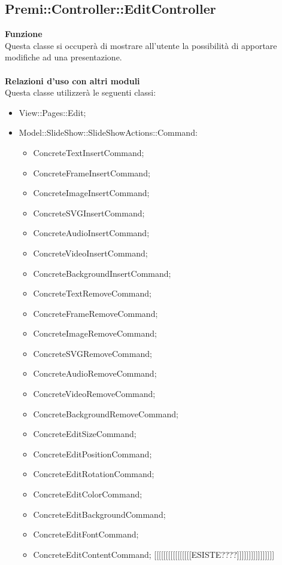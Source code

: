 {				\subsection{Premi::Controller::EditController}{
					\textbf{Funzione}\\
					\indent Questa classe si occuperà di mostrare all'utente la possibilità di apportare modifiche ad una presentazione.\\\\
					\textbf{Relazioni d'uso con altri moduli}\\
					\indent Questa classe utilizzerà le seguenti classi:
					\begin{itemize}
						\item View::Pages::Edit;
						\item Model::SlideShow::SlideShowActions::Command:
						\begin{itemize}
							\item ConcreteTextInsertCommand;
							\item ConcreteFrameInsertCommand;
							\item ConcreteImageInsertCommand;
							\item ConcreteSVGInsertCommand;
							\item ConcreteAudioInsertCommand;
							\item ConcreteVideoInsertCommand;
							\item ConcreteBackgroundInsertCommand;
							\item ConcreteTextRemoveCommand;
							\item ConcreteFrameRemoveCommand;
							\item ConcreteImageRemoveCommand;
							\item ConcreteSVGRemoveCommand;
							\item ConcreteAudioRemoveCommand;
							\item ConcreteVideoRemoveCommand;
							\item ConcreteBackgroundRemoveCommand;
							\item ConcreteEditSizeCommand;
							\item ConcreteEditPositionCommand;
							\item ConcreteEditRotationCommand;
							\item ConcreteEditColorCommand;
							\item ConcreteEditBackgroundCommand;
							\item ConcreteEditFontCommand;
							\item ConcreteEditContentCommand; [[[[[[[[[[[[[[[[ESISTE????]]]]]]]]]]]]]]]]

\end{itemize}
\end{itemize}}}

